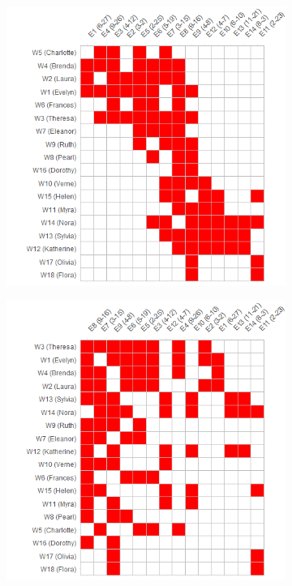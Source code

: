 \documentclass[a4paper,fleqn]{cas-sc}
\begin{document}
\begin{figure}[ht!]
    \captionsetup[subfigure]{font=footnotesize,labelfont=footnotesize}
    \centering
     \begin{subfigure}[b]{0.45\textwidth}
        \includegraphics[width=1.0\textwidth]{Plots/ca-reord.png}
            \caption{}
            \label{fig:ca-reord}
    \end{subfigure}
     \begin{subfigure}[b]{0.45\textwidth}
        \includegraphics[width=1.0\textwidth]{Plots/bon-reord1.png}

\end{subfigure}
\end{figure}
\end{document}
